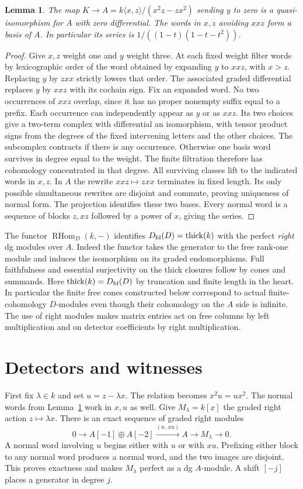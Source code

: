\documentclass[11pt]{article}
\newtheorem{lem}[thm]{Lemma}
\newcommand{\Dfd}{D_{\rm fd}}
\newcommand{\thick}{\operatorname{thick}}
\newcommand{\RHom}{\operatorname{RHom}}
\begin{document}
\begin{lem}\label{normal}
The map $K\to A=k\langle x,z\rangle/(x^2z-zx^2)$ sending $y$ to zero
is a quasi-isomorphism for $A$ with zero differential. The words in
$x,z$ avoiding $xxz$ form a basis of $A$. In particular its series is
$1/((1-t)(1-t-t^2))$.
\end{lem}
\begin{proof}
Give $x,z$ weight one and $y$ weight three. At each fixed weight filter
words by lexicographic order of the word obtained by expanding $y$ to
$xxz$, with $x>z$. Replacing $y$ by $zxx$ strictly lowers that order.
The associated graded differential replaces $y$ by $xxz$ with its
cochain sign. Fix an expanded word. No two occurrences of $xxz$ overlap,
since it has no proper nonempty suffix equal to a prefix. Each occurrence
can independently appear as $y$ or as $xxz$. Its two choices give a
two-term complex with differential an isomorphism, with tensor product
signs from the degrees of the fixed intervening letters and the other
choices. The subcomplex contracts if there is any occurrence. Otherwise
one basis word survives in degree equal to the weight. The finite
filtration therefore has cohomology concentrated in that degree.
All surviving classes lift to the indicated words in $x,z$. In $A$ the
rewrite $xxz\mapsto zxx$ terminates in fixed length. Its only possible
simultaneous rewrites are disjoint and commute, proving uniqueness of
normal form. The projection identifies these two bases. Every normal word
is a sequence of blocks $z,xz$ followed by a power of $x$, giving the series.
\end{proof}

The functor $\RHom_D(k,-)$ identifies $\Dfd(D)=\thick(k)$ with the
perfect \emph{right} dg modules over $A$. Indeed the functor takes the
generator to the free rank-one module and induces the isomorphism on its
graded endomorphisms. Full faithfulness and essential surjectivity on
the thick closures follow by cones and summands. Here $\thick(k)=\Dfd(D)$
by truncation and finite length in the heart. In particular the finite
free cones constructed below correspond to actual finite-cohomology
$D$-modules even though their cohomology on the $A$ side is infinite.
The use of right modules makes matrix entries act on free columns by
left multiplication and on detector coefficients by right multiplication.

\section{Detectors and witnesses}
First fix $\lambda\in k$ and set $u=z-\lambda x$. The relation becomes
$x^2u=ux^2$. The normal words from Lemma~\ref{normal} work in $x,u$
as well. Give $M_\lambda=k[x]$ the graded right action
$z\mapsto\lambda x$. There is an exact sequence of graded right modules
\[
 0\longrightarrow A[-1]\oplus A[-2]
  \xrightarrow{(u,\,xu)} A\longrightarrow M_\lambda\longrightarrow0 .
\]
A normal word involving $u$ begins either with $u$ or with $xu$.
Prefixing either block to any normal word produces a normal word, and
the two images are disjoint. This proves exactness and makes $M_\lambda$
perfect as a dg $A$-module. A shift $[-j]$ places a generator in degree $j$.
\end{document}
